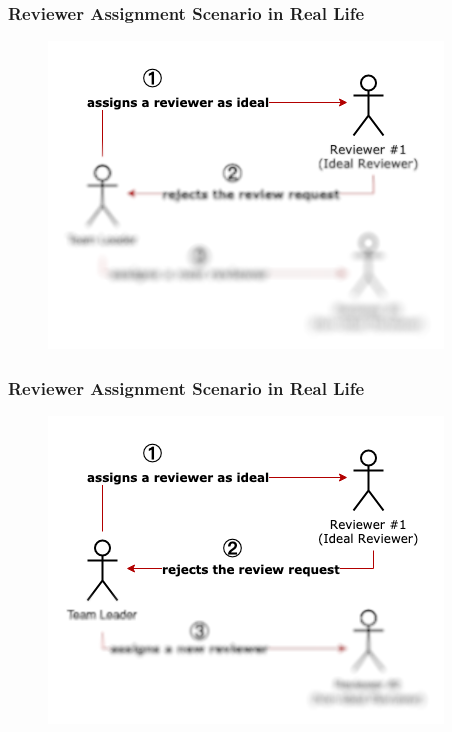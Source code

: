 \documentclass{beamer}
\begin{document}
\begin{frame}
\frametitle{\large Reviewer Assignment Scenario in Real Life}
  \begin{figure}
    \includegraphics[scale=0.6]{img/gt_1.png}
    \end{figure}

\end{frame}
\begin{frame}
\frametitle{\large Reviewer Assignment Scenario in Real Life}
  \begin{figure}
    \includegraphics[scale=0.6]{img/gt_2.png}
    \end{figure}

\end{frame}
\end{document}
